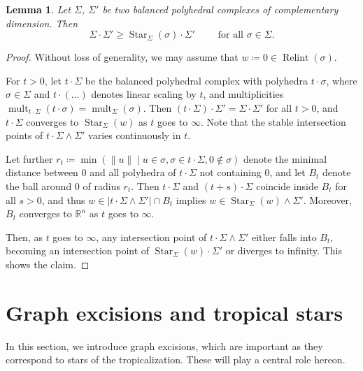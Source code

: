 \documentclass[11pt,reqno,a4paper]{amsart}
\theoremstyle{theoremstyle}
\newtheorem{lemma}[theorem]{Lemma}
\theoremstyle{examplestyle}
\theoremstyle{algorithmstyle}
\newcommand{\RR}{\mathbb{R}}
\DeclareMathOperator{\mult}{mult}
\DeclareMathOperator{\Relint}{Relint}
\DeclareMathOperator{\Star}{Star}
\begin{document}
\begin{lemma}
  \label{lem:intersectionProductAndStar}
  Let $\Sigma$, $\Sigma'$ be two balanced polyhedral complexes of complementary dimension.  Then
  \begin{equation*}
    \Sigma\cdot\Sigma'\geq \Star_{\Sigma}(\sigma)\cdot \Sigma' \qquad\text{ for all }\sigma\in\Sigma.
  \end{equation*}
\end{lemma}
\begin{proof}
    Without loss of generality, we may assume that $w\coloneqq 0\in\Relint(\sigma)$.

  For $t>0$, let $t\cdot\Sigma$ be the balanced polyhedral complex with polyhedra $t\cdot\sigma$, where $\sigma\in\Sigma$ and $t\cdot (\ldots)$ denotes linear scaling by $t$, and multiplicities $\mult_{t\cdot\Sigma}(t\cdot\sigma)=\mult_{\Sigma}(\sigma)$.  Then $(t\cdot \Sigma)\cdot\Sigma'=\Sigma\cdot\Sigma'$ for all $t>0$, and $t\cdot \Sigma$ converges to $\Star_{\Sigma}(w)$ as $t$ goes to $\infty$. Note that the stable intersection points of $t\cdot\Sigma\wedge\Sigma'$ varies continuously in $t$.

  Let further $r_t\coloneqq\min(\|u\|\mid u\in \sigma, \sigma\in t\cdot\Sigma, 0\notin\sigma)$ denote the minimal distance between $0$ and all polyhedra of $t\cdot \Sigma$ not containing $0$, and let $B_t$ denote the ball around $0$ of radius $r_t$.  Then $t\cdot \Sigma$ and $(t+s)\cdot\Sigma$ coincide inside $B_t$ for all $s>0$, and thus $w\in |t\cdot \Sigma\wedge\Sigma'|\cap B_t$ implies $w\in\Star_{\Sigma}(w)\wedge\Sigma'$.  Moreover, $B_t$ converges to $\RR^n$ as $t$ goes to $\infty$.

  Then, as $t$ goes to $\infty$, any intersection point of $t\cdot\Sigma\wedge\Sigma'$ either falls into $B_t$, becoming an intersection point of $\Star_{\Sigma}(w)\cdot\Sigma'$ or diverges to infinity. This shows the claim.
\end{proof}




\section{Graph excisions and tropical stars}\label{sec:excision}
In this section, we introduce graph excisions, which are important as they correspond to stars of the tropicalization.  These will play a central role hereon.
\end{document}
